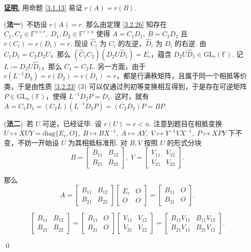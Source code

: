 \documentclass[10pt,openany]{article}
\theoremstyle{thmstyle} %
\theoremstyle{defstyle} %
\theoremstyle{prostyle} %
\theoremstyle{exastyle}
\theoremstyle{remstyle}
\renewenvironment{proof}[1][证明]{\par\underline{\textbf{#1.}} \;\fangsong}{\qed\par}
\newcommand{\F}{\mathbb{F}}
\newcommand{\gfn}{\text{GL}_n(\mathbb{F})}
\newcommand{\diag}{\mathrm{diag}}
\begin{document}
\begin{proof}
	用命题 \ref{3.1.13} 易证 \( r(A)=r(B) \). 
	
	(\textbf{法一})\ 不妨设 \( r(A)=r \). 那么由定理 \ref{3.2.26} 知存在 \( C_1,C_2 \in \F^{n \times r}, \; D_1,D_2 \in \F^{r \times n} \) 使得 \( A=C_1D_1, \; B=C_2D_2 \) 且 \( r(C_i)=r(D_i)=r \). 现设 \( \hat{C}_i \) 为 \( C_i \) 的左逆，\( \hat{D}_i \) 为 \( D_i \) 的右逆. 由 \( C_1D_1=C_2D_2U \)，那么 \( (\hat{C}_1C_2)(D_2U\hat{D}_1)=E_r \)，蕴含 \( D_2U\hat{D}_1 \in \text{GL}_r(\F) \). 记 \( L:=D_2U\hat{D}_1 \)，那么 \( C_1=C_2L \). 另一方面，由于 \( r(L^{-1}D_2)=r(D_2)=r(D_1)=r \)，都是行满秩矩阵，且属于同一个相抵等价类，于是由性质 \ref{3.2.23} (3) 可以仅通过列初等变换相互得到，于是存在可逆矩阵 \( P \in \gfn \)，使得 \( L^{-1}D_2P=D_1 \). 这时，就有 \( A=C_1D_1=(C_2L)(L^{-1}D_2P)= (C_2D_2)P=BP \).	
	
	\vspace{1ex}
	
	(\textbf{法二})\ 若 \( U \) 可逆，已经证毕. 设 \( r(U)=r<n \). 注意到题目在相抵变换 \( U \mapsto XUY=\diag\{E_r,O\}, \; B \mapsto BX^{-1}, \; A \mapsto AY, \; V \mapsto Y^{-1}VX^{-1}, \; P \mapsto XPY \) 下不变，不妨一开始设 \( U \) 为其相抵标准形. 对 \( B,V \) 按照 \( U \) 的形式分块
	\[ B=\begin{bmatrix}
		B_{11} & B_{12} \\
		B_{21} & B_{22}
	\end{bmatrix}, \; V=\begin{bmatrix}
	V_{11} & V_{12} \\
	V_{21} & V_{22}
	\end{bmatrix}. \]
	
	那么
	\[ A=\begin{bmatrix}
		B_{11} & B_{12} \\
		B_{21} & B_{22}
	\end{bmatrix}\begin{bmatrix}
	E_r & O \\
	O & O
	\end{bmatrix}=\begin{bmatrix}
	B_{11} & O \\
	B_{21} & O
	\end{bmatrix}. \]
	
	\[ \begin{bmatrix}
		B_{11} & B_{12} \\
		B_{21} & B_{22}
	\end{bmatrix}=\begin{bmatrix}
	B_{11} & O \\
	B_{21} & O
	\end{bmatrix}\begin{bmatrix}
	V_{11} & V_{12} \\
	V_{21} & V_{22}
	\end{bmatrix}=\begin{bmatrix}
	B_{11}V_{11} & B_{11}V_{12} \\
	B_{21}V_{11} & B_{21}V_{12}
	\end{bmatrix}. \]
	

\end{proof}
\end{document}
